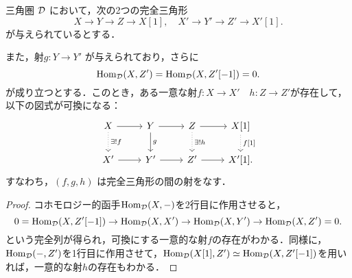 \begin{prop}\cite[p.247]{KS06}
三角圏 ${\mathcal D}$ において，次の2つの完全三角形
\[
X \rightarrow Y \rightarrow Z \rightarrow X[1], \quad
X' \rightarrow Y' \rightarrow Z' \rightarrow X'[1].
\]
が与えられているとする．

また，射$g\colon Y\to Y'$ が与えられており，さらに
\[
\operatorname{\mathrm{Hom}}_{{\mathcal D}}(X, Z') = \operatorname{\mathrm{Hom}}_{{\mathcal D}}(X, Z'[-1]) = 0.
\]
が成り立つとする．このとき，ある一意な射$f\colon X\to X'\quad h\colon Z\to Z'$が存在して，以下の図式が可換になる：
\[
\begin{tikzcd}
	X \arrow{r} \arrow[dotted]{d}{\exists !f} & Y \arrow{r} \arrow{d}{ g} & Z \arrow{r} \arrow[dotted]{d}{\exists !h} & X[1] \arrow[dotted]{d}{f[1]} \\
X' \arrow{r} & Y' \arrow{r} & Z' \arrow{r} & X'[1].
\end{tikzcd}
\]
すなわち，$(f,g,h)$ は完全三角形の間の射をなす．
\end{prop}
\begin{proof}
	コホモロジー的函手$\operatorname{\mathrm{Hom}}_{{\mathcal D}}(X,-)$を2行目に作用させると，
	\[0=\operatorname{\mathrm{Hom}}_{{\mathcal D}}(X,Z'[-1])\rightarrow \operatorname{\mathrm{Hom}}_{{\mathcal D}}(X,X') \rightarrow \operatorname{\mathrm{Hom}}_{{\mathcal D}}(X,Y') \rightarrow \operatorname{\mathrm{Hom}}_{{\mathcal D}}(X,Z')=0.\]
	という完全列が得られ，可換にする一意的な射$f$の存在がわかる．同様に，$\operatorname{\mathrm{Hom}}_{{\mathcal D}}(-,Z')$を1行目に作用させて，$\operatorname{\mathrm{Hom}}_{{\mathcal D}}(X[1],Z')\simeq \operatorname{\mathrm{Hom}}_{{\mathcal D}}(X,Z'[-1])$を用いれば，一意的な射$h$の存在もわかる．

\end{proof}
